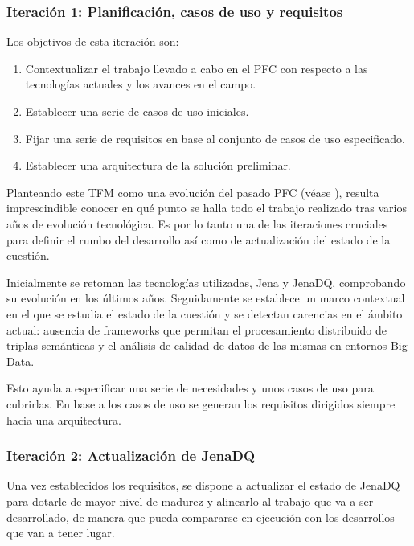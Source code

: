 

\subsubsection{Iteración 1: Planificación, casos de uso y requisitos}

Los objetivos de esta iteración son:

\begin{enumerate}

  \item Contextualizar el trabajo llevado a cabo en el \acs{PFC} con respecto a
  las tecnologías actuales y los avances en el campo.
\item Establecer una serie de casos de uso iniciales.
\item Fijar una serie de requisitos en base al conjunto de casos de uso
  especificado.
\item Establecer una arquitectura de la solución preliminar.

\end{enumerate}

Planteando este \acs{TFM} como una evolución del pasado \acs{PFC} (véase \cite{PFC}), resulta
imprescindible conocer en qué punto se halla todo el trabajo realizado tras
varios años de evolución tecnológica. Es por lo tanto una de las iteraciones
cruciales para definir el rumbo del desarrollo así como de actualización del
estado de la cuestión.

Inicialmente se retoman las tecnologías utilizadas, Jena y JenaDQ, comprobando
su evolución en los últimos años. Seguidamente se establece un marco contextual
en el que se estudia el estado de la cuestión y se detectan carencias en el
ámbito actual: ausencia de frameworks que permitan el procesamiento distribuido
de triplas semánticas y el análisis de calidad de datos de las mismas en
entornos Big Data. 

Esto ayuda a especificar una serie de necesidades y unos casos de uso para
cubrirlas. En base a los casos de uso se generan los requisitos dirigidos
siempre hacia una arquitectura.



\subsubsection{Iteración 2: Actualización de JenaDQ}

Una vez establecidos los requisitos, se dispone a actualizar el estado de JenaDQ
para dotarle de mayor nivel de madurez y alinearlo al trabajo que va a ser
desarrollado, de manera que pueda compararse en ejecución con los desarrollos
que van a tener lugar. 

